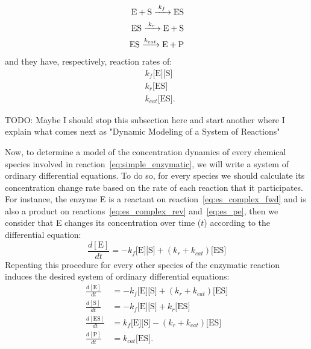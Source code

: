 \begin{subequations}
\begin{align}
\ce{
    E + S ->[\ce{$k_f$}] ES 
} \label{eq:es_complex_fwd} \\
\ce{
    ES ->[$k_r$] E + S
} \label{eq:es_complex_rev} \\
\ce{
    ES ->[$k_{cat}$] E + P
} \label{eq:es_pe} 
\end{align}
\end{subequations}
and they have, respectively, reaction rates of:
\begin{equation*}
\begin{aligned}
    & k_f\text{[E][S]} \\
    & k_r\text{[ES]} \\
    & k_{cat}\text{[ES]}.
\end{aligned}
\end{equation*}

{\color{blue} TODO: Maybe I should stop this subsection here and start another
where I explain what comes next as "Dynamic Modeling of a System of Reactions"}

Now, to determine a model of the concentration dynamics of every 
chemical species involved in reaction~\ref{eq:simple_enzymatic}, we will
write a system of ordinary differential equations. To do so, for every 
species we should calculate its concentration change rate based on the 
rate of each reaction that it participates. For instance, the enzyme E is a 
reactant on reaction~\ref{eq:es_complex_fwd} and is also a product on 
reactions~\ref{eq:es_complex_rev} and~\ref{eq:es_pe}, then we consider 
that E changes its concentration over time ($t$) according to the 
differential equation:
\begin{equation}
    \frac{d[\text{E}]}{dt} = -k_f\text{[E][S]} + (k_r + k_{cat}) \text{[ES]}
\end{equation} 
Repeating this procedure for every other species of the enzymatic 
reaction induces the desired system of ordinary differential equations:
\begin{subequations}
    \label{eq:full_system}
    \begin{align}
        \frac{d[\text{E}]}{dt} & =  
            -k_f\text{[E][S]} + (k_r + k_{cat}) \text{[ES]} 
            \label{eq:dEdt} \\
        \frac{d[\text{S}]}{dt}  & = 
            -k_f\text{[E][S]} + k_r\text{[ES]} 
            \label{eq:dSdt} \\
        \frac{d[\text{ES}]}{dt} & =  
            k_f\text{[E][S]} - (k_r + k_{cat}) \text{[ES]} 
            \label{eq:dESdt} \\
        \frac{d[\text{P}]}{dt} & = k_{cat}\text{[ES]} \label{eq:dPdt}.
    \end{align}
\end{subequations}

